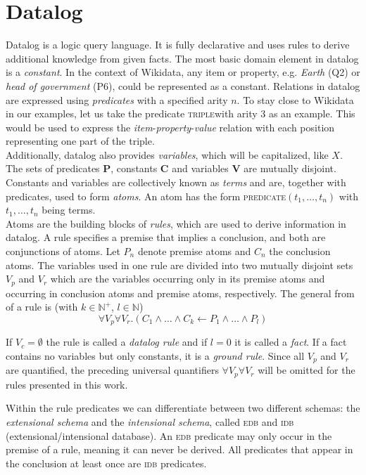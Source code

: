 \documentclass[hyperref,bachelorofscience,fleqn]{cgvpub}
\begin{document}
\section{Datalog}
Datalog is a logic query language. It is fully declarative and uses rules to derive additional knowledge from given facts. The most basic domain element in datalog is a \emph{constant}. In the context of Wikidata, any item or property, e.g. \emph{Earth} (Q2) or \emph{head of government} (P6), could be represented as a constant. Relations in datalog are expressed using \emph{predicates} with a specified arity \(n\). To stay close to Wikidata in our examples, let us take the predicate \textsc{triple}with arity 3 as an example. This would be used to express the \emph{item}-\emph{property}-\emph{value} relation with each position representing one part of the triple.\\
Additionally, datalog also provides \emph{variables}, which will be capitalized, like \(X\). The sets of predicates {\bf P}, constants {\bf C} and variables {\bf V} are mutually disjoint. Constants and variables are collectively known as \emph{terms} and are, together with predicates, used to form \emph{atoms}. An atom has the form \textsc{predicate}\((t_1, \ldots , t_n)\) with \(t_1,\ldots,t_n\) being terms.\\
Atoms are the building blocks of \emph{rules}, which are used to derive information in datalog. A rule specifies a premise that implies a conclusion, and both are conjunctions of atoms.
Let \(P_n\) denote  premise atoms and \(C_n\) the conclusion atoms. The variables used in one rule are divided into two mutually disjoint sets \(V_p\) and \(V_r\) which are the variables occurring only in its premise atoms and occurring in conclusion atoms and premise atoms, respectively. The general from of a rule is (with \(k \in \mathbb{N}^+\), \(l \in \mathbb{N}\))
\begin{equation}
\forall V_p \forall V_r.(C_1 \wedge \ldots \wedge C_k \leftarrow P_1 \wedge \ldots \wedge P_l)
\end{equation}

If \(V_c = \emptyset\) the rule is called a \emph{datalog rule} and if \(l = 0\) it is called a \emph{fact}. If a fact contains no variables but only constants, it is a \emph{ground rule}. Since all \(V_p\) and \(V_r\) are  quantified, the preceding universal quantifiers \(\forall V_p \forall V_r\) will be omitted for the rules presented in this work.

Within the rule predicates we can differentiate between two different schemas: the \emph{extensional schema} and the \emph{intensional schema}, called \textsc{edb} and \textsc{idb} (extensional/intensional database). An \textsc{edb} predicate may only occur in the premise of a rule, meaning it can never be derived. All predicates that appear in the conclusion at least once are \textsc{idb} predicates.
\end{document}
